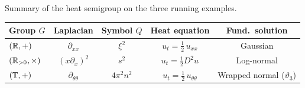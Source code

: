 \begin{example}\label{ex:heat-summary}
Summary of the heat semigroup on the three running examples.
\begin{center}
\renewcommand{\arraystretch}{1.4}
\footnotesize
\begin{tabular}{@{}lcccc@{}}
\textbf{Group $G$} & \textbf{Laplacian} & \textbf{Symbol $Q$} & \textbf{Heat equation} & \textbf{Fund.\ solution} \\
\hline
$(\mathbb{R}, +)$ & $\partial_{xx}$ & $\xi^2$ & $u_t = \tfrac{1}{2}\, u_{xx}$ & Gaussian \\
$(\mathbb{R}_{>0}, \times)$ & $(x\partial_x)^2$ & $s^2$ & $u_t = \tfrac{1}{2}D^2 u$ & Log-normal \\
$(\mathbb{T}, +)$ & $\partial_{\theta\theta}$ & $4\pi^2 n^2$ & $u_t = \tfrac{1}{2}\, u_{\theta\theta}$ & Wrapped normal ($\vartheta_3$)
\end{tabular}
\normalsize
\end{center}
\end{example}

